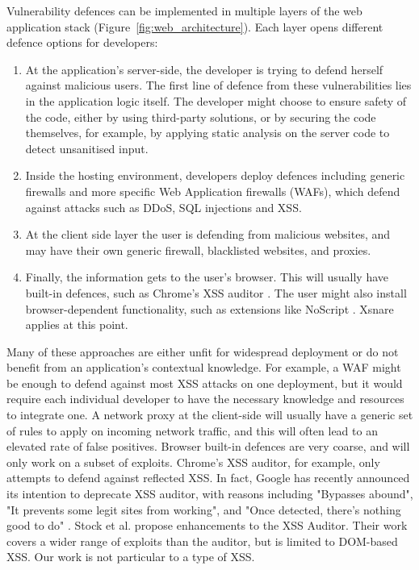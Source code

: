 Vulnerability defences can be implemented in multiple layers of the web application stack (Figure~\ref{fig:web_architecture}). Each layer opens different defence options for developers:
\begin{enumerate}
	\item At the application's server-side, the developer is
          trying to defend herself against malicious users. The first
          line of defence from these vulnerabilities lies in the
          application logic itself. The developer might choose to
          ensure safety of the code, either by using third-party
          solutions, or by securing the code themselves, for example,
          by applying static analysis on the server code to detect
          unsanitised input.
	\item Inside the hosting environment, developers deploy
          defences including generic firewalls and more specific Web
          Application firewalls (WAFs), which defend against attacks
          such as DDoS, SQL injections and XSS.
	\item At the client side layer the user is defending from
          malicious websites, and may have their own generic firewall,
          blacklisted websites, and proxies.
	\item Finally, the information gets to the user's
          browser. This will usually have built-in defences, such as
          Chrome's XSS auditor \cite{xssauditor}. The user might also
          install browser-dependent functionality, such as extensions
          like NoScript \cite{Noscript}. Xsnare applies at this point.
\end{enumerate}

Many of these approaches are either unfit for widespread deployment or
do not benefit from an application's contextual knowledge. For
example, a WAF might be enough to defend against most XSS attacks on
one deployment, but it would require each individual developer to have
the necessary knowledge and resources to integrate one. A network
proxy at the client-side will usually have a generic set of rules to
apply on incoming network traffic, and this will often lead to an
elevated rate of false positives. Browser built-in defences are very
coarse, and will only work on a subset of exploits. Chrome's XSS
auditor, for example, only attempts to defend against reflected
XSS. In fact, Google has recently announced its intention to deprecate
XSS auditor, with reasons including "Bypasses abound", "It prevents
some legit sites from working", and "Once detected, there’s nothing
good to do" \cite{deprecatexssauditor}. Stock et
al. \cite{Stock:2017:WTI:3241189.3241265} propose enhancements to the
XSS Auditor. Their work covers a wider range of exploits than the
auditor, but is limited to DOM-based XSS. Our work is not particular
to a type of XSS.


